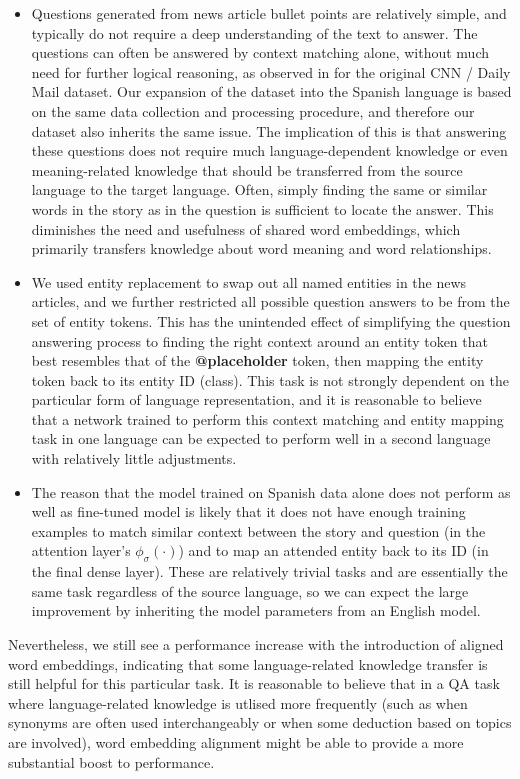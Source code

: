 \documentclass[]{article}
\begin{document}
\begin{itemize}
	\item Questions generated from news article bullet points are relatively simple, and typically do not require a deep understanding of the text to answer. The questions can often be answered by context matching alone, without much need for further logical reasoning, as observed in \cite{chen2016thorough} for the original CNN / Daily Mail dataset. Our expansion of the dataset into the Spanish language is based on the same data collection and processing procedure, and therefore our dataset also inherits the same issue. The implication of this is that answering these questions does not require much language-dependent knowledge or even meaning-related knowledge that should be transferred from the source language to the target language. Often, simply finding the same or similar words in the story as in the question is sufficient to locate the answer. This diminishes the need and usefulness of shared word embeddings, which primarily transfers knowledge about word meaning and word relationships.
	\item We used entity replacement to swap out all named entities in the news articles, and we further restricted all possible question answers to be from the set of entity tokens. This has the unintended effect of simplifying the question answering process to finding the right context around an entity token that best resembles that of the \textbf{@placeholder} token, then mapping the entity token back to its entity ID (class). This task is not strongly dependent on the particular form of language representation, and it is reasonable to believe that a network trained to perform this context matching and entity mapping task in one language can be expected to perform well in a second language with relatively little adjustments.
	\item The reason that the model trained on Spanish data alone does not perform as well as fine-tuned model is likely that it does not have enough training examples to match similar context between the story and question (in the attention layer's $\phi_\sigma(\cdot)$) and to map an attended entity back to its ID (in the final dense layer). These are relatively trivial tasks and are essentially the same task regardless of the source language, so we can expect the large improvement by inheriting the model parameters from an English model.
\end{itemize}

Nevertheless, we still see a performance increase with the introduction of aligned word embeddings, indicating that some language-related knowledge transfer is still helpful for this particular task. It is reasonable to believe that in a QA task where language-related knowledge is utlised more frequently (such as when synonyms are often used interchangeably or when some deduction based on topics are involved), word embedding alignment might be able to provide a more substantial boost to performance.
\end{document}
